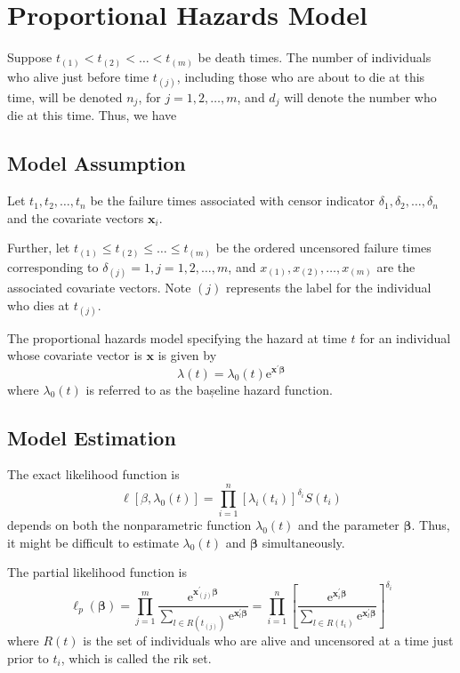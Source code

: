 \begin{example}

\end{example}

\section{Proportional Hazards Model}

Suppose $t_{(1)}<t_{(2)}<\ldots<t_{(m)}$ be death times. The number of
individuals who alive just before time $t_{(j)}$, including those who are about to die at this time, will be denoted $n_{j}$, for $j=1,2,\ldots,m$, and $d_{j}$ will denote the number who die at this time. Thus, we have

\subsection{Model Assumption}

Let $t_{1},t_{2},\ldots,t_{n}$ be the failure times associated with censor indicator $\delta_{1},\delta_{2},\ldots,\delta_{n}$ and the covariate vectors $\mathbf{x}_{i}$.

Further, let $t_{(1)}\leq t_{(2)}\leq\ldots\leq t_{(m)}$ be the ordered uncensored failure times corresponding to $\delta_{(j)}=1,j=1,2,\ldots,m$, and $x_{(1)},x_{(2)},\ldots,x_{(m)}$ are the associated covariate vectors. Note $(j)$ represents the label for the individual who dies at $t_{(j)}$.

The proportional hazards model specifying the hazard at time $t$ for an individual whose covariate vector is $\mathbf{x}$ is given by
\begin{equation}
    \lambda(t)=\lambda_{0}(t)\mathrm{e}^{\mathbf{x}^{\prime}\boldsymbol{\beta}}
\end{equation}
where $\lambda_{0}(t)$ is referred to as the bașeline hazard function.

\subsection{Model Estimation}

The exact likelihood function is
\begin{equation}
    \ell\left[\beta,\lambda_{0}(t)\right]=\prod_{i=1}^{n}\left[\lambda_{i}\left(t_{i}\right)\right]^{\delta_{i}}S\left(t_{i}\right)
\end{equation}
depends on both the nonparametric function $\lambda_{0}(t)$ and the parameter $\boldsymbol{\beta}$. Thus, it might be difficult to estimate $\lambda_{0}(t)$ and $\boldsymbol{\beta}$ simultaneously.

The partial likelihood function is
\begin{equation}
    \ell_{p}(\boldsymbol{\beta})=\prod_{j=1}^{m}\frac{\mathrm{e}^{\mathbf{x}_{(j)}^{\prime}\boldsymbol{\beta}}}{\sum_{l\in R\left(t_{(j)}\right)}\mathrm{e}^{\mathbf{x}_{l}^{\prime}\boldsymbol{\beta}}}=\prod_{i=1}^{n}\left[\frac{\mathrm{e}^{\mathbf{x}_{i}^{\prime}\boldsymbol{\beta}}}{\sum_{l\in R\left(t_{i}\right)}\mathrm{e}^{\mathbf{x}_{l}^{\prime}\boldsymbol{\beta}}}\right]^{\delta_{i}}
\end{equation}
where $R(t)$ is the set of individuals who are alive and uncensored at a time just prior to $t_{i}$, which is called the rik set.
